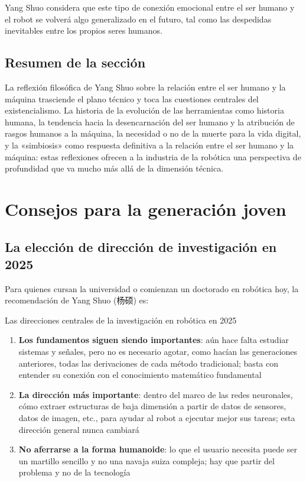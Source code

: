 \documentclass[a4paper]{article}
\begin{document}
Yang Shuo considera que este tipo de conexión emocional entre el ser humano y el robot se volverá algo generalizado en el futuro, tal como las despedidas inevitables entre los propios seres humanos.

\subsection{Resumen de la sección}

La reflexión filosófica de Yang Shuo sobre la relación entre el ser humano y la máquina trasciende el plano técnico y toca las cuestiones centrales del existencialismo. La historia de la evolución de las herramientas como historia humana, la tendencia hacia la desencarnación del ser humano y la atribución de rasgos humanos a la máquina, la necesidad o no de la muerte para la vida digital, y la «simbiosis» como respuesta definitiva a la relación entre el ser humano y la máquina: estas reflexiones ofrecen a la industria de la robótica una perspectiva de profundidad que va mucho más allá de la dimensión técnica.

\section{Consejos para la generación joven}

\subsection{La elección de dirección de investigación en 2025}

Para quienes cursan la universidad o comienzan un doctorado en robótica hoy, la recomendación de Yang Shuo (杨硕) es:

\begin{knowledgebox}{Las direcciones centrales de la investigación en robótica en 2025}
\begin{enumerate}
    \item \textbf{Los fundamentos siguen siendo importantes}: aún hace falta estudiar sistemas y señales, pero no es necesario agotar, como hacían las generaciones anteriores, todas las derivaciones de cada método tradicional; basta con entender su conexión con el conocimiento matemático fundamental
    \item \textbf{La dirección más importante}: dentro del marco de las redes neuronales, cómo extraer estructuras de baja dimensión a partir de datos de sensores, datos de imagen, etc., para ayudar al robot a ejecutar mejor sus tareas; esta dirección general nunca cambiará
    \item \textbf{No aferrarse a la forma humanoide}: lo que el usuario necesita puede ser un martillo sencillo y no una navaja suiza compleja; hay que partir del problema y no de la tecnología
\end{enumerate}
\end{knowledgebox}
\end{document}
